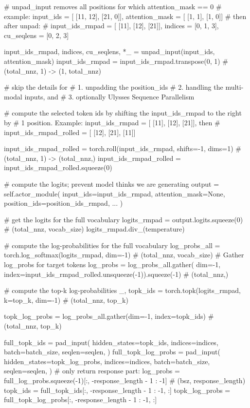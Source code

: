 \begin{enumerate}
\begin{codeblock}[language=Python]
# unpad_input removes all positions for which attention_mask == 0
# example: input_ids = [ [11, 12], [21, 0]], attention_mask = [ [1, 1], [1, 0]]
# then after unpad:
# input_ids_rmpad = [ [11], [12], [21]], indices = [0, 1, 3], cu_seqlens = [0, 2, 3]

input_ids_rmpad, indices, cu_seqlens, *_ = unpad_input(input_ids, attention_mask)
input_ids_rmpad = input_ids_rmpad.transpose(0, 1)  # (total_nnz, 1) -> (1, total_nnz)

# skip the details for 
# 1. unpadding the position_ids
# 2. handling the multi-modal inputs, and 
# 3. optionally Ulysses Sequence Parallelism

# compute the selected token ids by shifting the input_ids_rmpad to the right by
# 1 position. Example: input_ids_rmpad = [ [11], [12], [21]], then
# input_ids_rmpad_rolled = [ [12], [21], [11]]

input_ids_rmpad_rolled = torch.roll(input_ids_rmpad, shifts=-1, dims=1)
# (total_nnz, 1) -> (total_nnz,)
input_ids_rmpad_rolled = input_ids_rmpad_rolled.squeeze(0) 

# compute the logits; prevent model thinks we are generating
output = self.actor_module(
    input_ids=input_ids_rmpad,
    attention_mask=None,
    position_ids=position_ids_rmpad,
    ...
)

# get the logits for the full vocabulary
logits_rmpad = output.logits.squeeze(0)  # (total_nnz, vocab_size)
logits_rmpad.div_(temperature)

# compute the log-probabilities for the full vocabulary
log_probs_all = torch.log_softmax(logits_rmpad, dim=-1)  # (total_nnz, vocab_size)
# Gather log_probs for target tokens
log_probs = log_probs_all.gather(
    dim=-1, index=input_ids_rmpad_rolled.unsqueeze(-1)).squeeze(-1) # (total_nnz,)

# compute the top-k log-probabilities
_, topk_ids = torch.topk(logits_rmpad, k=top_k, dim=-1) # (total_nnz, top_k)

topk_log_probs = log_probs_all.gather(dim=-1, index=topk_ids) # (total_nnz, top_k)

full_topk_ids = pad_input(
    hidden_states=topk_ids,
    indices=indices,
    batch=batch_size,
    seqlen=seqlen,
)
full_topk_log_probs = pad_input(
    hidden_states=topk_log_probs,
    indices=indices,
    batch=batch_size,
    seqlen=seqlen,
)
# only return response part:
log_probs = full_log_probs.squeeze(-1)[:, -response_length - 1 : -1]  # (bsz, response_length)
topk_ids = full_topk_ids[:, -response_length - 1 : -1, :]
topk_log_probs = full_topk_log_probs[:, -response_length - 1 : -1, :]
    \end{codeblock}


\end{enumerate}
